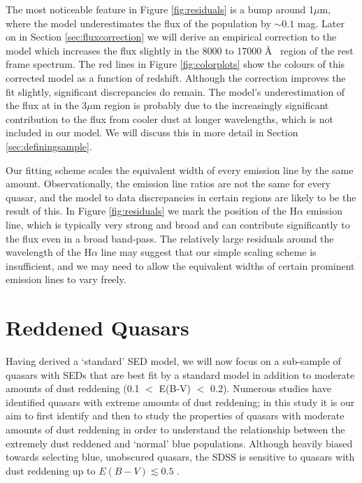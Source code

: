 The most noticeable feature in Figure \ref{fig:residuals} is a bump around 1$\mu$m, where the model underestimates the flux of the population by $\sim 0.1$ mag. Later on in Section \ref{sec:fluxcorrection} we will derive an empirical correction to the model which increases the flux slightly in the 8000 to 17000 \AA~ region of the rest frame spectrum. The red lines in Figure \ref{fig:colorplots} show the colours of this corrected model as a function of redshift. Although the correction improves the fit slightly, significant discrepancies do remain. The model's underestimation of the flux at in the 3$\mu$m region is probably due to the increasingly significant contribution to the flux from cooler dust at longer wavelengths, which is not included in our model. We will discuss this in more detail in Section \ref{sec:definingsample}. 

Our fitting scheme scales the equivalent width of every emission line by the same amount. Observationally, the emission line ratios are not the same for every quasar, and the model to data discrepancies in certain regions are likely to be the result of this. In Figure \ref{fig:residuals} we mark the position of the H$\alpha$ emission line, which is typically very strong and broad and can contribute significantly to the flux even in a broad band-pass. The relatively large residuals around the wavelength of the H$\alpha$ line may suggest that our simple scaling scheme is insufficient, and we may need to allow the equivalent widths of certain prominent emission lines to vary freely. 

\section{Reddened Quasars}
\label{sec:redobjects}

Having derived a `standard' SED model, we will now focus on a sub-sample of quasars with SEDs that are best fit by a standard model in addition to moderate amounts of dust reddening (0.1 $<$ E(B-V) $<$ 0.2). Numerous studies have identified quasars with extreme amounts of dust reddening; in this study it is our aim to first identify and then to study the properties of quasars with moderate amounts of dust reddening in order to understand the relationship between the extremely dust reddened and `normal' blue populations. Although heavily biased towards selecting blue, unobscured quasars, the SDSS is sensitive to quasars with dust reddening up to $E(B-V) \lesssim 0.5$ \citep{richards03}. 

